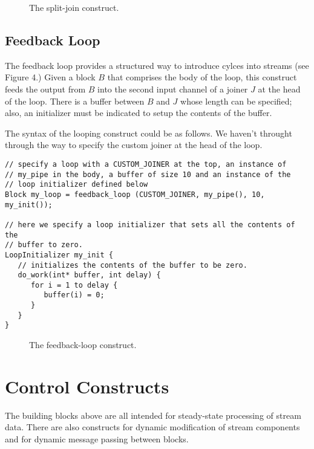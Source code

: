 \begin{figure}[t]
\centerline{}
\vspace{-24pt}
\caption{\protect\small The split-join construct.}
\end{figure}

\subsection{Feedback Loop}

The feedback loop provides a structured way to introduce cylces into
streams (see Figure 4.)  Given a block $B$ that comprises the body of
the loop, this construct feeds the output from $B$ into the second input
channel of a joiner $J$ at the head of the loop.  There is a buffer
between $B$ and $J$ whose length can be specified; also, an initializer
must be indicated to setup the contents of the buffer.

The syntax of the looping construct could be as follows.  We haven't
throught through the way to specify the custom joiner at the head of the
loop.

\begin{verbatim}
// specify a loop with a CUSTOM_JOINER at the top, an instance of
// my_pipe in the body, a buffer of size 10 and an instance of the 
// loop initializer defined below
Block my_loop = feedback_loop (CUSTOM_JOINER, my_pipe(), 10, my_init());

// here we specify a loop initializer that sets all the contents of the
// buffer to zero.
LoopInitializer my_init {
   // initializes the contents of the buffer to be zero.
   do_work(int* buffer, int delay) {
      for i = 1 to delay {
         buffer(i) = 0;
      }
   }
}

\end{verbatim}

\begin{figure}[t]
\centerline{}
\caption{\protect\small The feedback-loop construct.}
\end{figure}

\section{Control Constructs}

The building blocks above are all intended for steady-state processing
of stream data.  There are also constructs for dynamic modification of
stream components and for dynamic message passing between blocks.  

